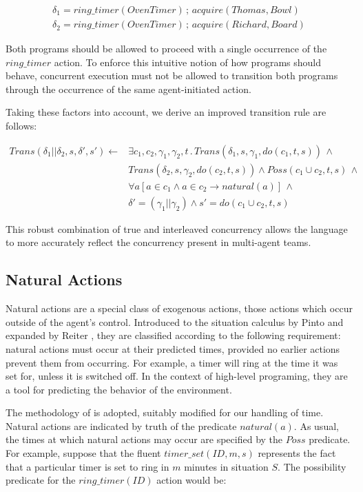 \documentclass{llncs}
\begin{document}
\begin{align*}
\delta_{1}=ring\_ timer(OvenTimer)\,;\, acquire(Thomas,Bowl)\\
\delta_{2}=ring\_ timer(OvenTimer)\,;\, acquire(Richard,Board)
\end{align*}


Both programs should be allowed to proceed with a single occurrence
of the $ring\_ timer$ action. To enforce this intuitive notion of
how programs should behave, concurrent execution must not be allowed
to transition both programs through the occurrence of the same agent-initiated
action.

Taking these factors into account, we derive an improved transition
rule are follows:

\begin{align*}
Trans(\delta_{1}||\delta_{2},s,\delta',s')\leftarrow & \exists c_{1},c_{2},\gamma_{1},\gamma_{2},t\,.\, Trans(\delta_{1},s,\gamma_{1},do(c_{1},t,s))\,\wedge\\
 & Trans(\delta_{2},s,\gamma_{2},do(c_{2},t,s))\wedge Poss(c_{1}\cup c_{2},t,s)\,\wedge\\
 & \forall a\left[a\in c_{1}\wedge a\in c_{2}\rightarrow natural(a)\right]\,\wedge\\
 & \delta'=(\gamma_{1}||\gamma_{2})\wedge s'=do(c_{1}\cup c_{2},t,s)
\end{align*}


This robust combination of true and interleaved concurrency allows
the language to more accurately reflect the concurrency present in
multi-agent teams.


\subsection{Natural Actions}

\label{sub:Natural-Actions}

Natural actions are a special class of exogenous actions, those actions
which occur outside of the agent's control. Introduced to the situation
calculus by Pinto \cite{pinto94temporal} and expanded by Reiter \cite{reiter96sc_nat_conc},
they are classified according to the following requirement: natural
actions must occur at their predicted times, provided no earlier actions
prevent them from occurring. For example, a timer will ring at the
time it was set for, unless it is switched off. In the context of
high-level programing, they are a tool for predicting the behavior
of the environment.

The methodology of \cite{reiter96sc_nat_conc} is adopted, suitably
modified for our handling of time. Natural actions are indicated by
truth of the predicate $natural(a)$. As usual, the times at which
natural actions may occur are specified by the $Poss$ predicate.
For example, suppose that the fluent $timer\_ set(ID,m,s)$ represents
the fact that a particular timer is set to ring in $m$ minutes in
situation $S$. The possibility predicate for the $ring\_ timer(ID)$
action would be:
\end{document}
